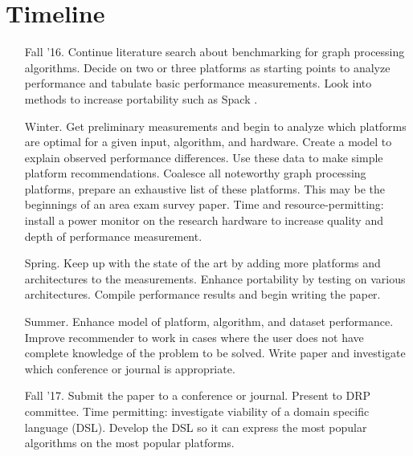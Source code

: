 \documentclass[11pt]{article}
\begin{document}
\section{Timeline}
	\begin{enumerate}
		\item[Fall '16.] Continue literature search about benchmarking for graph processing algorithms. Decide on two or three platforms as starting points to analyze performance and tabulate basic performance measurements. Look into methods to increase portability such as Spack \cite{Gamblin:2015:Spack}.
		\item[Winter.]  Get preliminary measurements and begin to analyze which platforms are optimal for a given input, algorithm, and hardware. Create a model to explain observed performance differences. Use these data to make simple platform recommendations. Coalesce all noteworthy graph processing platforms, prepare an exhaustive list of these platforms. This may be the beginnings of an area exam survey paper. Time and resource-permitting: install a power monitor on the research hardware to increase quality and depth of performance measurement.
		\item[Spring.] Keep up with the state of the art by adding more platforms and architectures to the measurements. Enhance portability by testing on various architectures. Compile performance results and begin writing the paper.
		\item[Summer.] Enhance model of platform, algorithm, and dataset performance. Improve recommender to work in cases where the user does not have complete knowledge of the problem to be solved. Write paper and investigate which conference or journal is appropriate.
		\item[Fall '17.] Submit the paper to a conference or journal. Present to DRP committee. Time permitting: investigate viability of a domain specific language (DSL). Develop the DSL so it can express the most popular algorithms on the most popular platforms.
	\end{enumerate}
\end{document}
